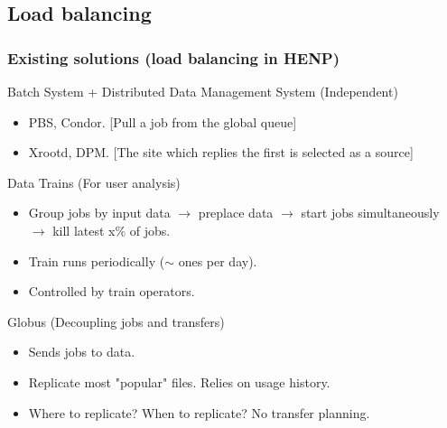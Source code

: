 \documentclass{beamer}
\begin{document}
\subsection{Load balancing}
\begin{frame}\frametitle{Existing solutions (load balancing in HENP)} 	
\begin{block}{Batch System + Distributed Data Management System (Independent)}  
		\begin{itemize}
			\item PBS, Condor. [Pull a job from the global queue]
			\item Xrootd, DPM. [The site which replies the first is selected as a source] 			
		\end{itemize}
 	\end{block} 	
\begin{block}{Data Trains (For user analysis)}	
	 \begin{itemize}
	 \item Group jobs by input data $\longrightarrow$ preplace data $\longrightarrow$ start jobs simultaneously $\longrightarrow$ kill latest x\% of jobs. 
	 \item Train runs periodically ($\sim$ ones per day).  
 	 \item Controlled by train operators. 
 	  \end{itemize}
\end{block}
\begin{block}{Globus (Decoupling jobs and transfers)} 	
\begin{itemize}
 	 \item Sends jobs to data.  
 	 \item Replicate most "popular" files. Relies on usage history.
 	 \item Where to replicate? When to replicate? No transfer planning.
 	 \end{itemize}
\end{block} 	 
\end{frame}
\end{document}
